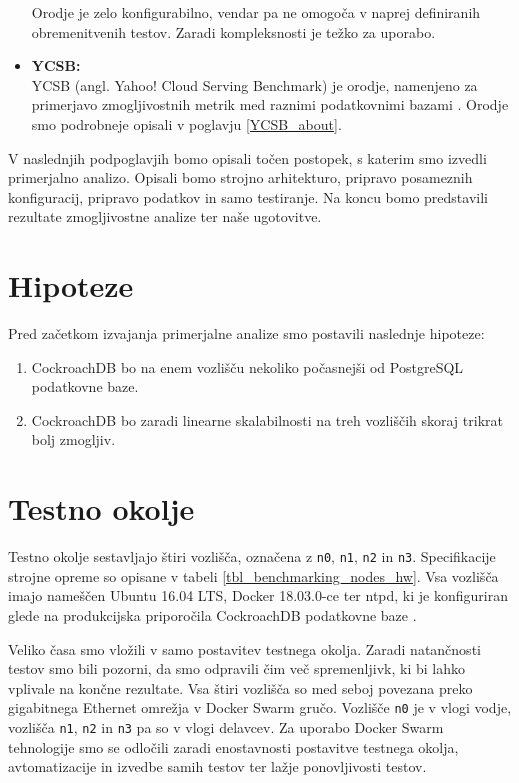 \documentclass[a4paper, 12pt]{book}
\begin{document}
\begin{itemize}
    Orodje je zelo konfigurabilno, vendar pa ne omogoča v naprej definiranih obremenitvenih testov. Zaradi kompleksnosti je težko za uporabo.
    \item \textbf{YCSB:}\\ YCSB (angl. Yahoo! Cloud Serving Benchmark) je orodje, namenjeno za primerjavo zmogljivostnih metrik med raznimi podatkovnimi bazami \cite{brianfrankcooper/YCSB}. Orodje smo podrobneje opisali v poglavju \ref{YCSB_about}.
\end{itemize}

V naslednjih podpoglavjih bomo opisali točen postopek, s katerim smo izvedli primerjalno analizo. Opisali bomo strojno arhitekturo, pripravo posameznih konfiguracij, pripravo podatkov in samo testiranje. Na koncu bomo predstavili rezultate zmogljivostne analize ter naše ugotovitve.

\section{Hipoteze}
Pred začetkom izvajanja primerjalne analize smo postavili naslednje hipoteze:
\begin{enumerate}
    \item CockroachDB bo na enem vozlišču nekoliko počasnejši od PostgreSQL podatkovne baze.

    \item CockroachDB bo zaradi linearne skalabilnosti na treh vozliščih skoraj trikrat bolj zmogljiv.
\end{enumerate}

\section{Testno okolje}
Testno okolje sestavljajo štiri vozlišča, označena z \texttt{n0}, \texttt{n1}, \texttt{n2} in \texttt{n3}. Specifikacije strojne opreme so opisane v tabeli \ref{tbl_benchmarking_nodes_hw}. Vsa vozlišča imajo nameščen Ubuntu 16.04 LTS, Docker 18.03.0-ce ter ntpd, ki je konfiguriran glede na produkcijska priporočila  CockroachDB podatkovne baze \cite{CRDB-ntpd-configuration}.

Veliko časa smo vložili v samo postavitev testnega okolja. Zaradi natančnosti testov smo bili pozorni, da smo odpravili čim več spremenljivk, ki bi lahko vplivale na končne rezultate.
Vsa štiri vozlišča so med seboj povezana preko gigabitnega Ethernet omrežja v Docker Swarm \cite{Docker-Swarm-Mode} gručo. Vozlišče \texttt{n0} je v vlogi vodje, vozlišča \texttt{n1}, \texttt{n2} in \texttt{n3} pa so v vlogi delavcev. Za uporabo Docker Swarm tehnologije smo se odločili zaradi enostavnosti postavitve testnega okolja, avtomatizacije in izvedbe samih testov ter lažje ponovljivosti testov.
\end{document}
